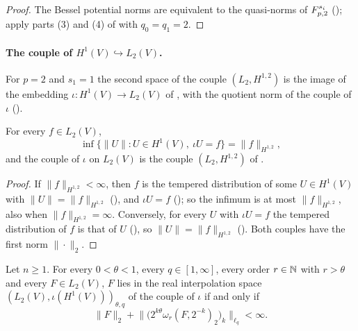 \begin{proof}
\leanok
The Bessel potential norms are equivalent to the quasi-norms of $F^{s_i}_{p,2}$
(); apply parts (3) and (4) of  with
$q_0 = q_1 = 2$.
\end{proof}

\paragraph{The couple of $H^1(V) \hookrightarrow L_2(V)$.}
For $p = 2$ and $s_1 = 1$ the second space of the couple $(L_2, H^{1,2})$ is the image of the
embedding $\iota \colon H^1(V) \to L_2(V)$ of , with the quotient norm
of the couple of $\iota$ ().

\begin{lemma}
\label{lem:sobolev-one-map-couple}
\leanok
{}
For every $f \in L_2(V)$,
\[
  \inf \{\|U\| : U \in H^1(V), \ \iota U = f\} = \|f\|_{H^{1,2}} ,
\]
and the couple of $\iota$ on $L_2(V)$ is the couple $(L_2, H^{1,2})$ of
.
\end{lemma}

\begin{proof}
\leanok
If $\|f\|_{H^{1,2}} < \infty$, then $f$ is the tempered distribution of some $U \in H^1(V)$ with
$\|U\| = \|f\|_{H^{1,2}}$ (), and $\iota U = f$
(); so the infimum is at most $\|f\|_{H^{1,2}}$, also when
$\|f\|_{H^{1,2}} = \infty$. Conversely, for every $U$ with $\iota U = f$ the tempered distribution
of $f$ is that of $U$ (), so $\|U\| = \|f\|_{H^{1,2}}$
(). Both couples have the first norm $\|\cdot\|_2$.
\end{proof}

\begin{lemma}[$(L_2(V), H^1(V))_{\theta, q} = B^\theta_{2,q}(V)$]
\label{lem:sobolev-whole-space-interpolation}
\leanok
{}
Let $n \geq 1$. For every $0 < \theta < 1$, every $q \in [1, \infty]$, every order $r \in \mathbb{N}$
with $r > \theta$ and every $F \in L_2(V)$, $F$ lies in the real interpolation space
$(L_2(V), \iota(H^1(V)))_{\theta, q}$ of the couple of $\iota$ if and only if
\[
  \|F\|_2 + \bigl\| \bigl(2^{k\theta} \omega_r(F, 2^{-k})_2\bigr)_k \bigr\|_{\ell_q} < \infty .
\]
\end{lemma}

